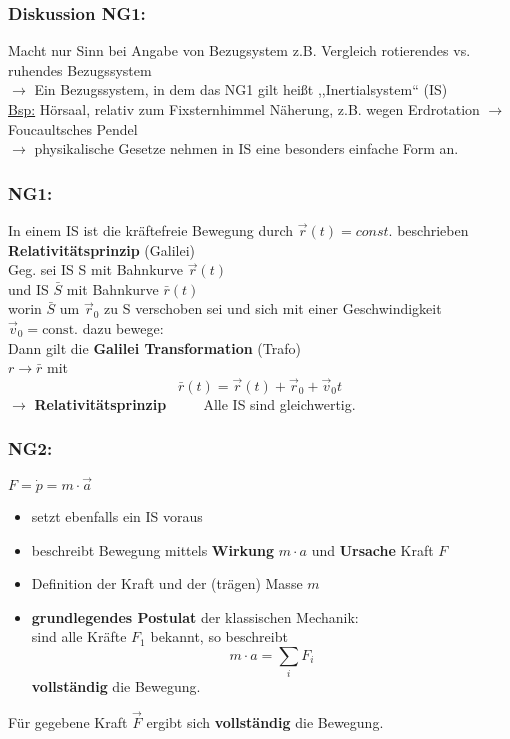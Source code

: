 \documentclass[titlepage,12pt,a4paper,ngerman]{report}
\newcommand{\tx}[1]{\textrm{#1}}
\newcommand{\const}{\tx{const.}}
\begin{document}
\subsubsection{Diskussion NG1:} Macht nur Sinn bei Angabe von Bezugsystem z.B. Vergleich rotierendes vs. ruhendes Bezugssystem\\
$\rightarrow$ Ein Bezugssystem, in dem das NG1 gilt heißt ,,Inertialsystem`` (IS)\\
\underline{Bsp:} Hörsaal, relativ zum Fixsternhimmel
Näherung, z.B. wegen Erdrotation $\rightarrow$ Foucaultsches Pendel\\
$\rightarrow$ physikalische Gesetze nehmen in IS eine besonders einfache Form an.
\subsubsection{NG1:}
In einem IS ist die kräftefreie Bewegung durch $\vec{r}(t) = const.$ beschrieben
\textbf{Relativitätsprinzip} (Galilei)\\
Geg. sei IS S mit Bahnkurve $\vec{r}(t)$\\
und IS $\bar{S}$ mit Bahnkurve $\bar{r}(t)$\\
worin $\bar{S}$ um $\vec{r}_{0}$ zu S verschoben sei und sich mit einer Geschwindigkeit $\vec{v}_{0} = \const$ dazu bewege:\\
Dann gilt die \textbf{Galilei Transformation} (Trafo)\\
$ r \rightarrow \bar{r}$ mit
\begin{equation*}
\bar{r} (t) = \vec{r}(t) + \vec{r}_{0} + \vec{v}_{0} t \tag{1}
\end{equation*}
$\rightarrow$ \textbf{Relativitätsprinzip} $ \qquad  $
Alle IS sind gleichwertig.
\subsubsection{NG2:} $F = \dot{p} = m \cdot \vec{a}$ %
\begin{itemize}
	\item setzt ebenfalls ein IS voraus
	\item beschreibt Bewegung mittels \textbf{Wirkung} $m\cdot a$ und \textbf{Ursache} Kraft $F$
	\item Definition der Kraft und der (trägen) Masse $m$
	\item \textbf{grundlegendes Postulat} der klassischen Mechanik:\\
	sind alle Kräfte $F_{1}$ bekannt, so beschreibt $$m\cdot a = \sum_{i} F_{i}$$ \textbf{vollständig} die Bewegung.
\end{itemize}
Für gegebene Kraft $\vec{F}$ ergibt sich \textbf{vollständig} die Bewegung.
\end{document}

